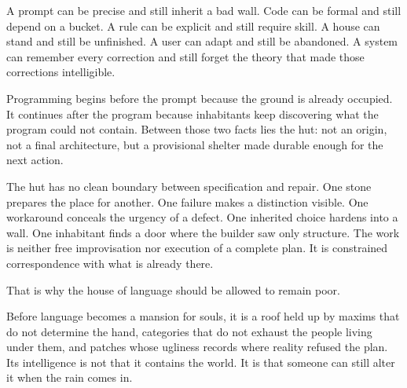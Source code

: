 \documentclass[11pt]{article}
\begin{document}
A prompt can be precise and still inherit a bad wall. Code can be formal and still depend on a bucket. A rule can be explicit and still require skill. A house can stand and still be unfinished. A user can adapt and still be abandoned. A system can remember every correction and still forget the theory that made those corrections intelligible.

Programming begins before the prompt because the ground is already occupied. It continues after the program because inhabitants keep discovering what the program could not contain. Between those two facts lies the hut: not an origin, not a final architecture, but a provisional shelter made durable enough for the next action.

The hut has no clean boundary between specification and repair. One stone prepares the place for another. One failure makes a distinction visible. One workaround conceals the urgency of a defect. One inherited choice hardens into a wall. One inhabitant finds a door where the builder saw only structure. The work is neither free improvisation nor execution of a complete plan. It is constrained correspondence with what is already there.

That is why the house of language should be allowed to remain poor.

Before language becomes a mansion for souls, it is a roof held up by maxims that do not determine the hand, categories that do not exhaust the people living under them, and patches whose ugliness records where reality refused the plan. Its intelligence is not that it contains the world. It is that someone can still alter it when the rain comes in.
\end{document}
